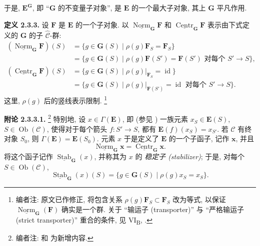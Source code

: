 于是, \(\mathbf E^{\mathbf G}\), 即 ``\(\mathbf G\) 的不变量子对象'',
是 \(\mathbf E\) 的一个最大子对象, 其上 \(\mathbf G\) 平凡作用.

\medskip
{}
\noindent\textbf{定义 2.3.3.}
设 \(\mathbf F\) 是 \(\mathbf E\) 的一个子对象. 以
\(\underline{\operatorname{Norm}}_{\mathbf G}\mathbf F\) 和
\(\underline{\operatorname{Centr}}_{\mathbf G}\mathbf F\) 表示由下式定义的
\(\mathbf G\) 的子 \(\widehat{\mathscr C}\)-群:
\begin{align*}
  (\underline{\operatorname{Norm}}_{\mathbf G}\mathbf F)(S)
    &={}
      \{g\in\mathbf G(S)\mid \rho(g)\mathbf F_S=\mathbf F_S\}\\
    &={}
      \{g\in\mathbf G(S)\mid
        \rho(g)\mathbf F(S')=\mathbf F(S')
        \text{ 对每个 }S'\to S\},\\
  (\underline{\operatorname{Centr}}_{\mathbf G}\mathbf F)(S)
    &={}
      \{g\in\mathbf G(S)\mid
        \rho(g)|_{\mathbf F_S}=\operatorname{id}\}\\
    &={}
      \{g\in\mathbf G(S)\mid
        \rho(g)|_{\mathbf F(S')}=\operatorname{id}
        \text{ 对每个 }S'\to S\}.
\end{align*}
这里, \(\rho(g)\) 后的竖线表示限制.
\footnote{编者注: 原文已作修正, 将包含关系
\(\rho(g)\mathbf F_S\subset\mathbf F_S\) 改为等式, 以保证
\(\underline{\operatorname{Norm}}_{\mathbf G}(\mathbf F)\) 确实是一个群.
关于 ``输运子 (transporter)'' 与 ``严格输运子 (strict transporter)''
重合的条件, 见 VI\textsubscript{B}, .}

\medskip
\noindent{}\textbf{附论 2.3.3.1.}
\footnote{编者注:  和
 为新增内容.}
特别地, 设 \(x\in\Gamma(\mathbf E)\), 即 (参见 )
一族元素 \(x_S\in\mathbf E(S)\),
\(S\in\operatorname{Ob}(\mathscr C)\), 使得对于每个箭头
\(f:S'\to S\), 都有
\(\mathbf E(f)(x_S)=x_{S'}\). 若 \(\mathscr C\) 有终对象
\(S_0\), 则 \(\Gamma(\mathbf E)=\mathbf E(S_0)\). 元素 \(x\)
于是定义了 \(\mathbf E\) 的一个子函子, 记作 \(\mathbf x\), 并且
\[
  \underline{\operatorname{Norm}}_{\mathbf G}\mathbf x
    =
  \underline{\operatorname{Centr}}_{\mathbf G}\mathbf x.
\]
将这个函子记作
\(\underline{\operatorname{Stab}}_{\mathbf G}(x)\), 并称其为 \(x\) 的
\emph{稳定子 (stabilizer)}; 于是, 对每个
\(S\in\operatorname{Ob}(\mathscr C)\),
\[
  \underline{\operatorname{Stab}}_{\mathbf G}(x)(S)
    =\{g\in\mathbf G(S)\mid\rho(g)x_S=x_S\}.
\]

